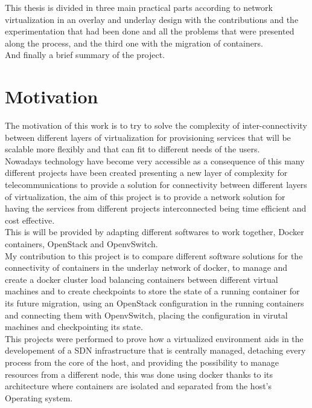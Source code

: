 This thesis is divided in three main practical parts according to network virtualization in an overlay and underlay design with the contributions and the experimentation that had been done and all the problems that were presented along the process, and the third one with the migration of containers.\\
 
And finally a brief summary of the project.\\
 
\section{Motivation} 

The motivation of this work is to try to solve the complexity of inter-connectivity between different layers of virtualization for provisioning services that will be scalable more flexibly and that can fit to different needs of the users.\\

Nowadays technology have become very accessible as a consequence of this many different projects have been created presenting a new layer of complexity for telecommunications to provide a solution for connectivity between different layers of virtualization, the aim of this project is to provide a network solution for having the services from different projects interconnected being time efficient and cost effective.\\

This is will be provided by adapting different softwares to work together, Docker containers, OpenStack and OpenvSwitch.\\

My contribution to this project is to compare different software solutions for the connectivity of containers in the underlay network of docker, to manage and create a docker cluster load balancing containers between different virtual machines and to create checkpoints to store the state of a running container for its future migration, using an OpenStack configuration in the running containers and connecting them with OpenvSwitch, placing the configuration in virutal machines and checkpointing its state.\\


This projects were performed to prove how a virtualized environment aids in the developement of a SDN infrastructure that is centrally managed, detaching every process from the core of the host, and providing the possibility to manage resources from a different node, this was done using docker thanks to its architecture where containers are isolated and separated from the host's Operating system.\\  

